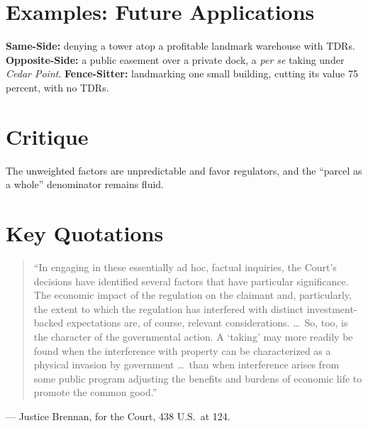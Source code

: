\documentclass[12pt]{article}
\begin{document}
\section{Examples: Future Applications}
\textbf{Same-Side:} denying a tower atop a profitable landmark warehouse with TDRs. \textbf{Opposite-Side:} a public easement over a private dock, a \textit{per se} taking under \textit{Cedar Point}. \textbf{Fence-Sitter:} landmarking one small building, cutting its value 75 percent, with no TDRs.

\section{Critique}
The unweighted factors are unpredictable and favor regulators, and the ``parcel as a whole'' denominator remains fluid.

\section{Key Quotations}
\begin{quote}
``In engaging in these essentially ad hoc, factual inquiries, the Court's decisions have identified several factors that have particular significance. The economic impact of the regulation on the claimant and, particularly, the extent to which the regulation has interfered with distinct investment-backed expectations are, of course, relevant considerations. \dots\ So, too, is the character of the governmental action. A `taking' may more readily be found when the interference with property can be characterized as a physical invasion by government \dots\ than when interference arises from some public program adjusting the benefits and burdens of economic life to promote the common good.''
\end{quote}
\noindent --- Justice Brennan, for the Court, 438 U.S.\ at 124.
\end{document}
